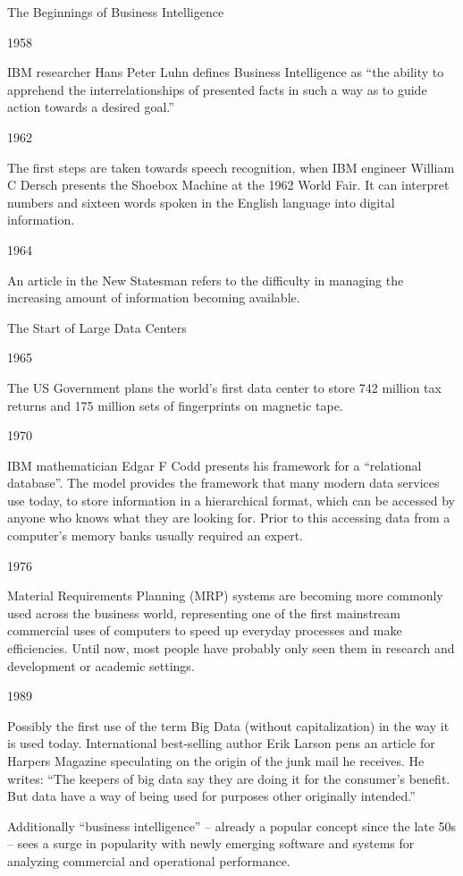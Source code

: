 The Beginnings of Business Intelligence

1958

IBM researcher Hans Peter Luhn defines Business Intelligence as “the ability to apprehend the interrelationships of presented facts in such a way as to guide action towards a desired goal.”

1962

The first steps are taken towards speech recognition, when IBM engineer William C Dersch presents the Shoebox Machine at the 1962 World Fair. It can interpret numbers and sixteen words spoken in the English language into digital information.

1964

An article in the New Statesman refers to the difficulty in managing the increasing amount of information becoming available.

The Start of Large Data Centers

1965

The US Government plans the world’s first data center to store 742 million tax returns and 175 million sets of fingerprints on magnetic tape.

1970

IBM mathematician Edgar F Codd presents his framework for a “relational database”. The model provides the framework that many modern data services use today, to store information in a hierarchical format, which can be accessed by anyone who knows what they are looking for. Prior to this accessing data from a computer’s memory banks usually required an expert.

1976

Material Requirements Planning (MRP) systems are becoming more commonly used across the business world, representing one of the first mainstream commercial uses of computers to speed up everyday processes and make efficiencies. Until now, most people have probably only seen them in research and development or academic settings.

1989

Possibly the first use of the term Big Data (without capitalization) in the way it is used today. International best-selling author Erik Larson pens an article for Harpers Magazine speculating on the origin of the junk mail he receives. He writes: “The keepers of big data say they are doing it for the consumer’s benefit. But data have a way of being used for purposes other originally intended.”

Additionally “business intelligence” – already a popular concept since the late 50s – sees a surge in popularity with newly emerging software and systems for analyzing commercial and operational performance.

